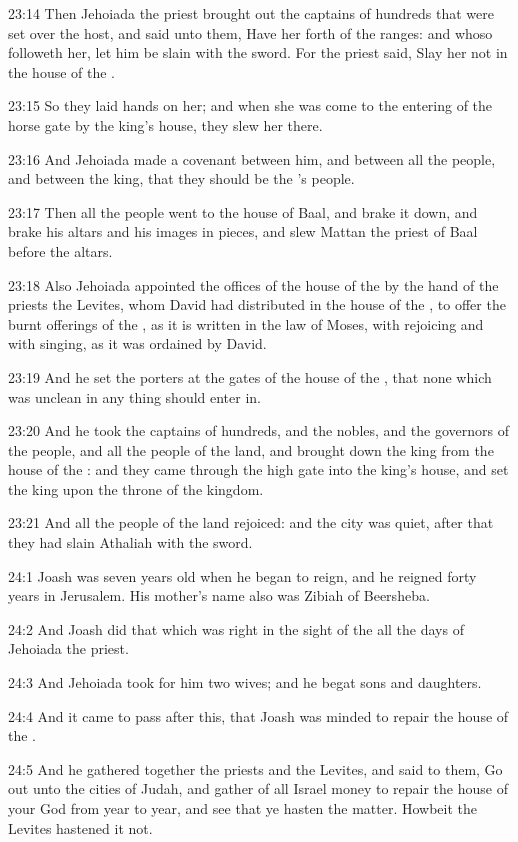 23:14 Then Jehoiada the priest brought out the captains of hundreds
that were set over the host, and said unto them, Have her forth of the
ranges: and whoso followeth her, let him be slain with the sword. For
the priest said, Slay her not in the house of the \LORD.

23:15 So they laid hands on her; and when she was come to the entering
of the horse gate by the king's house, they slew her there.

23:16 And Jehoiada made a covenant between him, and between all the
people, and between the king, that they should be the \LORD's people.

23:17 Then all the people went to the house of Baal, and brake it
down, and brake his altars and his images in pieces, and slew Mattan
the priest of Baal before the altars.

23:18 Also Jehoiada appointed the offices of the house of the \LORD by
the hand of the priests the Levites, whom David had distributed in the
house of the \LORD, to offer the burnt offerings of the \LORD, as it is
written in the law of Moses, with rejoicing and with singing, as it
was ordained by David.

23:19 And he set the porters at the gates of the house of the \LORD,
that none which was unclean in any thing should enter in.

23:20 And he took the captains of hundreds, and the nobles, and the
governors of the people, and all the people of the land, and brought
down the king from the house of the \LORD: and they came through the
high gate into the king's house, and set the king upon the throne of
the kingdom.

23:21 And all the people of the land rejoiced: and the city was quiet,
after that they had slain Athaliah with the sword.

24:1 Joash was seven years old when he began to reign, and he reigned
forty years in Jerusalem. His mother's name also was Zibiah of
Beersheba.

24:2 And Joash did that which was right in the sight of the \LORD all
the days of Jehoiada the priest.

24:3 And Jehoiada took for him two wives; and he begat sons and
daughters.

24:4 And it came to pass after this, that Joash was minded to repair
the house of the \LORD.

24:5 And he gathered together the priests and the Levites, and said to
them, Go out unto the cities of Judah, and gather of all Israel money
to repair the house of your God from year to year, and see that ye
hasten the matter. Howbeit the Levites hastened it not.

